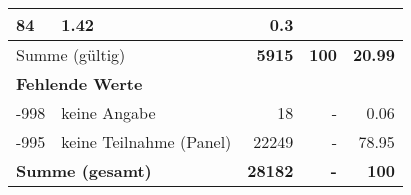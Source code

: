 \begin{longtable}{lXrrr}
       \num{84} &
       \num[round-mode=places,round-precision=2]{1.42} &
         \num[round-mode=places,round-precision=2]{0.3} \\
     \midrule
     \multicolumn{2}{l}{Summe (gültig)} &
       \textbf{\num{5915}} &
     \textbf{100} &
       \textbf{\num[round-mode=places,round-precision=2]{20.99}} \\
     \multicolumn{5}{l}{\textbf{Fehlende Werte}}\\
       -998 &
       keine Angabe &
         \num{18} &
        - &
         \num[round-mode=places,round-precision=2]{0.06} \\
       -995 &
       keine Teilnahme (Panel) &
         \num{22249} &
        - &
         \num[round-mode=places,round-precision=2]{78.95} \\
     \midrule
     \multicolumn{2}{l}{\textbf{Summe (gesamt)}} &
          \textbf{\num{28182}} &
        \textbf{-} &
        \textbf{100} \\
     \bottomrule
     \end{longtable}
     
